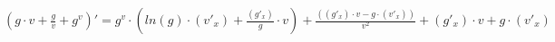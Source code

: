 \documentclass[a4paper,12pt]{article}
\begin{document}
\begin{math}
	(g \cdot v +  \frac{g}{v}  + g ^{v} )' = g ^{v}  \cdot ( ln (g)  \cdot (v'_{x} ) +  \frac{(g'_{x} )}{g}  \cdot v) +  \frac{((g'_{x} ) \cdot v - g \cdot (v'_{x} ))}{v ^{2} }  + (g'_{x} ) \cdot v + g \cdot (v'_{x} )\end{math}
\end{document}

